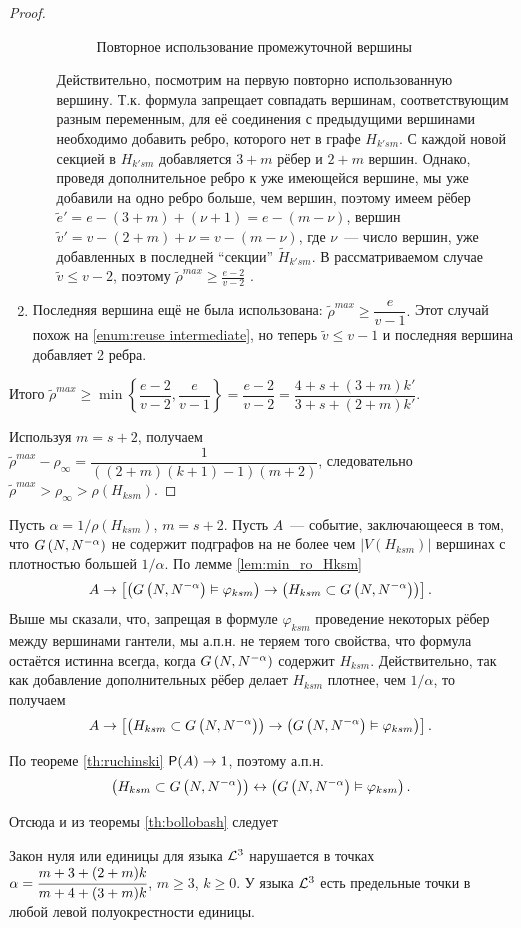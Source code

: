 \begin{proof}
\begin{enumerate}
\begin{enumerate}
\begin{figure}
  \caption{Повторное использование промежуточной вершины}
  \label{fig:reuse intermediate}
\end{figure}
\label{enum:reuse intermediate}
Действительно, посмотрим на первую повторно использованную вершину.
Т.к. формула запрещает совпадать вершинам, соответствующим разным переменным, для её соединения с предыдущими вершинами необходимо добавить ребро, которого нет в графе $H_{k'sm}$. 
С каждой новой секцией в $H_{k'sm}$ добавляется $3+m$ рёбер  и $2+m$ вершин.
Однако, проведя дополнительное ребро к уже имеющейся вершине, мы уже добавили на одно ребро больше, чем вершин, поэтому имеем рёбер $ \tilde e' = e - (3+m) + (\nu+1) = e - (m-\nu) $, вершин $\tilde v' = v - (2+m) + \nu = v - (m-\nu)$, где $\nu$~--- число вершин, уже добавленных в последней ``секции'' $\tilde H_{k'sm}$.
В рассматриваемом случае $\tilde v \leq v-2$, поэтому $\tilde \rho^{max} \geq \frac{e-2}{v-2}$ .
\end{enumerate}
\item
Последняя вершина ещё не была использована:
$\tilde \rho^{max} \geq \dfrac{e}{v-1}.$
Этот случай похож на \ref{enum:reuse intermediate}, но теперь $\tilde v \leq v-1$ и последняя вершина добавляет 2 ребра.
\end{enumerate}

Итого 
$\tilde \rho^{max} \geq \min \left\{\dfrac{e-2}{v-2}, \dfrac{e}{v-1}\right\} = \dfrac{e-2}{v-2} = \dfrac{4+s +(3+m)k'}{3+s + (2+m)k'}$. 

Используя $m=s+2$, получаем $\tilde \rho^{max} - \rho_\infty = \dfrac{1}{((2+m)(k+1)-1)(m+2)}$, следовательно
$\tilde \rho^{max} > \rho_\infty > \rho(H_{ksm}) $.

\end{proof}

Пусть $\alpha = 1/\rho(H_{ksm})$, $m=s+2$.
Пусть  $A$~--- событие, заключающееся в том, что $\Gna$ не содержит подграфов на не более чем $|V(H_{ksm})|$ вершинах с плотностью большей $1/\alpha$.
По лемме \ref{lem:min_ro_Hksm}
\[
A \rightarrow \left[\left(\Gna \vDash \varphi_{ksm} \right) \rightarrow \left(H_{ksm} \subset \Gna \right) \right] .
\]
Выше мы сказали, что, запрещая в формуле $\varphi_{ksm}$ проведение некоторых рёбер между вершинами гантели, мы а.п.н. не теряем того свойства, что формула остаётся истинна всегда, когда $\Gna$ содержит $H_{ksm}$.
Действительно, так как добавление дополнительных рёбер делает $H_{ksm}$ плотнее, чем $1/\alpha$, то получаем
\[
A \rightarrow \left[\left(H_{ksm} \subset \Gna \right) \rightarrow \left(\Gna \vDash \varphi_{ksm} \right)  \right] .
\]
 
По  теореме \ref{th:ruchinski} $\P(A) \rightarrow 1$, поэтому а.п.н. 
\[\left(H_{ksm} \subset \Gna \right) \leftrightarrow \left(\Gna \vDash \varphi_{ksm} \right).\]

Отсюда и из теоремы \ref{th:bollobash} следует

\begin{theorem}
\label{th:my limiting points}
 Закон нуля или единицы для языка $\LL^3$ нарушается в точках $\alpha = \cfrac{m+3 + (2+m)k}{m+4 + (3+m)k}$, $m \geq 3$, $k \geq 0$.
У языка $\LL^3$ есть предельные точки в любой левой полуокрестности единицы.
\end{theorem}